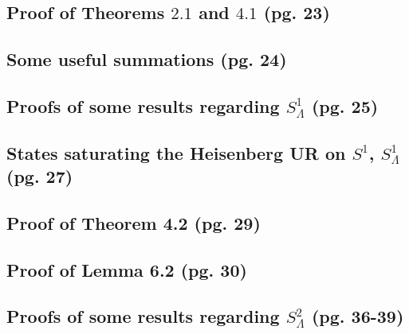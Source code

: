 \documentclass{article}
\begin{document}
\subsection{Proof of Theorems $2.1$ and $4.1$ (pg. 23)}

\subsection{Some useful summations (pg. 24)}

\subsection{Proofs of some results regarding $S^1_\Lambda$ (pg. 25)}

\subsection{States saturating the Heisenberg UR on $S^1$, $S^1_\Lambda$ (pg. 27)}

\subsection{Proof of Theorem 4.2 (pg. 29)}

\subsection{Proof of Lemma 6.2 (pg. 30)}

\subsection{Proofs of some results regarding $S^2_\Lambda$ (pg. 36-39)}
\end{document}
